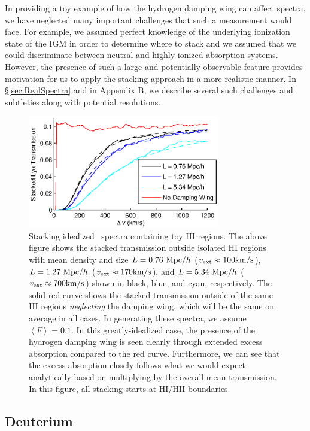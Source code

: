 In providing a toy example of how the hydrogen damping wing can affect spectra, we have neglected many important challenges that such a measurement would face. For example, we assumed perfect knowledge of the underlying ionization state of the IGM in order to determine where to stack and we assumed that we could discriminate between neutral and highly ionized absorption systems. However, the presence of such a large and potentially-observable feature provides motivation for us to apply the stacking approach in a more realistic manner. In \S \ref{sec:RealSpectra} and in Appendix B, we describe several such challenges and subtleties along with potential resolutions.


\begin{figure}[h]
  \centering
  \includegraphics[width=8.4cm]{fig4.eps}
  \caption{Stacking idealized \lya\ spectra containing toy HI regions. The above figure shows the stacked transmission outside isolated HI regions with mean density and size $L = 0.76 \ \text{Mpc/$h$}$ ($v_{\text{ext}} \approx 100\text{km}/\text{s}$), $L = 1.27 \ \text{Mpc/$h$}$ ($v_{\text{ext}} \approx 170\text{km}/\text{s}$), and $L = 5.34 \ \text{Mpc/$h$}$ ($v_{\text{ext}} \approx 700\text{km}/\text{s}$) shown in black, blue, and cyan, respectively. The solid red curve shows the stacked transmission outside of the same HI regions \textit{neglecting} the damping wing, which will be the same on average in all cases. In generating these spectra, we assume $\left\langle F \right\rangle = 0.1$. In this greatly-idealized case, the presence of the hydrogen damping wing is seen clearly through extended excess absorption compared to the red curve. Furthermore, we can see that the excess absorption closely follows what we would expect analytically based on multiplying  by the overall mean transmission. In this figure, all stacking starts at HI/HII boundaries.}
  \label{fig:ToyHI}
\end{figure}


\subsection{Deuterium} \label{sec:ToyD}



